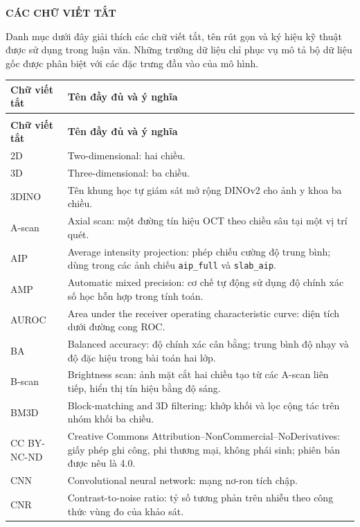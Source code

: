 \documentclass[14pt,a4paper,oneside]{extreport}
\begin{document}
\vspace{12pt}
\textbf{CÁC CHỮ VIẾT TẮT}

Danh mục dưới đây giải thích các chữ viết tắt, tên rút gọn và ký hiệu
kỹ thuật được sử dụng trong luận văn. Những trường dữ liệu chỉ phục vụ
mô tả bộ dữ liệu gốc được phân biệt với các đặc trưng đầu vào của mô hình.

\begingroup
\renewcommand{\arraystretch}{1.0}
\begin{longtable}{@{}>{\raggedright\arraybackslash}p{}>{\raggedright\arraybackslash}p{}@{}}
  \toprule
  \textbf{Chữ viết tắt} & \textbf{Tên đầy đủ và ý nghĩa}\\
  \midrule\endfirsthead
  \multicolumn{2}{c}{\textit{Danh mục chữ viết tắt (tiếp theo)}}\\
  \toprule
  \textbf{Chữ viết tắt} & \textbf{Tên đầy đủ và ý nghĩa}\\
  \midrule\endhead
  \bottomrule\endfoot
  2D & Two-dimensional: hai chiều.\\
  3D & Three-dimensional: ba chiều.\\
  3DINO & Tên khung học tự giám sát mở rộng DINOv2 cho ảnh y khoa ba chiều.\\
  A-scan & Axial scan: một đường tín hiệu OCT theo chiều sâu tại một vị trí quét.\\
  AIP & Average intensity projection: phép chiếu cường độ trung bình; dùng trong các ảnh chiếu \texttt{aip\_full} và \texttt{slab\_aip}.\\
  AMP & Automatic mixed precision: cơ chế tự động sử dụng độ chính xác số học hỗn hợp trong tính toán.\\
  AUROC & Area under the receiver operating characteristic curve: diện tích dưới đường cong ROC.\\
  BA & Balanced accuracy: độ chính xác cân bằng; trung bình độ nhạy và độ đặc hiệu trong bài toán hai lớp.\\
  B-scan & Brightness scan: ảnh mặt cắt hai chiều tạo từ các A-scan liên tiếp, hiển thị tín hiệu bằng độ sáng.\\
  BM3D & Block-matching and 3D filtering: khớp khối và lọc cộng tác trên nhóm khối ba chiều.\\
  CC BY-NC-ND & Creative Commons Attribution--NonCommercial--NoDerivatives: giấy phép ghi công, phi thương mại, không phái sinh; phiên bản được nêu là 4.0.\\
  CNN & Convolutional neural network: mạng nơ-ron tích chập.\\
  CNR & Contrast-to-noise ratio: tỷ số tương phản trên nhiễu theo công thức vùng đo của khảo sát.\\

\end{longtable}
\end{document}
